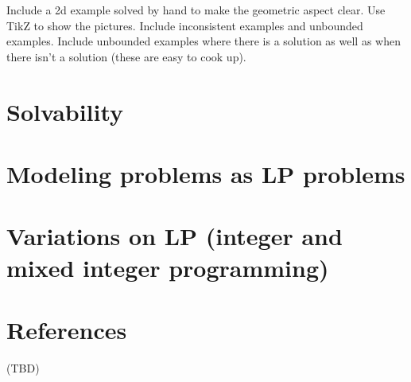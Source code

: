 \documentclass[12pt,english]{article}
\begin{document}
Include a 2d example solved by hand to make the geometric aspect clear.  Use TikZ to show the pictures.   Include inconsistent examples and unbounded examples.  Include unbounded examples where there is a solution as well as when there isn't a solution (these are easy to cook up).

\section{Solvability}

\section{Modeling problems as LP problems}

\section{Variations on LP (integer and mixed integer programming)}

\section{References}

(TBD)
\end{document}
